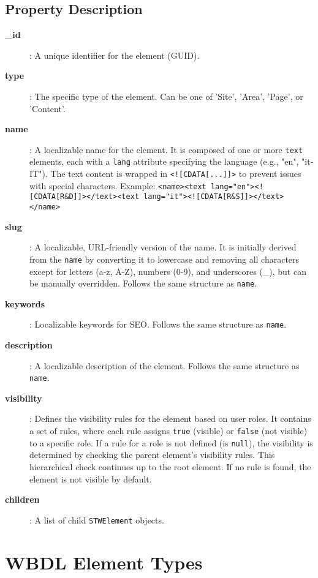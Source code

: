 \subsection{Property Description}

\begin{description}
\item[\textbf{\_id}]: A unique identifier for the element (GUID).
\item[\textbf{type}]: The specific type of the element. Can be one of 'Site', 'Area', 'Page', or 'Content'.
\item[\textbf{name}]: A localizable name for the element. It is composed of one or more \texttt{text} elements, each with a \texttt{lang} attribute specifying the language (e.g., "en", "it-IT"). The text content is wrapped in \texttt{<![CDATA[...]]>} to prevent issues with special characters. Example: \lstinline{<name><text lang="en"><![CDATA[R&D]]></text><text lang="it"><![CDATA[R&S]]></text></name>}
\item[\textbf{slug}]: A localizable, URL-friendly version of the name. It is initially derived from the \texttt{name} by converting it to lowercase and removing all characters except for letters (a-z, A-Z), numbers (0-9), and underscores (\_), but can be manually overridden. Follows the same structure as \texttt{name}.
\item[\textbf{keywords}]: Localizable keywords for SEO. Follows the same structure as \texttt{name}.
\item[\textbf{description}]: A localizable description of the element. Follows the same structure as \texttt{name}.
\item[\textbf{visibility}]: Defines the visibility rules for the element based on user roles. It contains a set of rules, where each rule assigns \texttt{true} (visible) or \texttt{false} (not visible) to a specific role. If a rule for a role is not defined (is \texttt{null}), the visibility is determined by checking the parent element's visibility rules. This hierarchical check continues up to the root element. If no rule is found, the element is not visible by default.
\item[\textbf{children}]: A list of child \texttt{STWElement} objects.
\end{description}

\section{WBDL Element Types}
\label{sec:wbdl-element-types}

